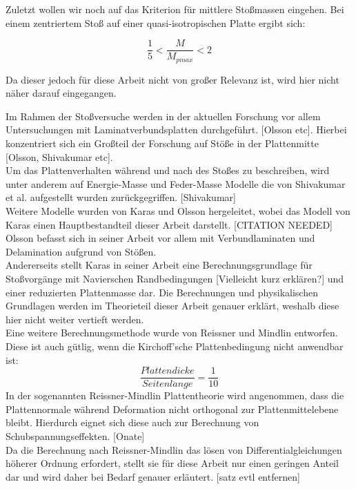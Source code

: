 Zuletzt wollen wir noch auf das Kriterion für mittlere Stoßmassen eingehen. Bei einem zentriertem Stoß auf einer quasi-isotropischen Platte ergibt sich:

\begin{equation}
	\frac{1}{5} < \frac{M}{M_{pmax}} < 2
\end{equation}

Da dieser jedoch für diese Arbeit nicht von großer Relevanz ist, wird hier nicht näher darauf eingegangen.



Im Rahmen der Stoßversuche werden in der aktuellen Forschung vor allem
Untersuchungen mit Laminatverbundsplatten durchgeführt. [Olsson etc]. Hierbei
konzentriert sich ein Großteil der Forschung auf Stöße in der Plattenmitte
[Olsson, Shivakumar etc]. \\
Um das Plattenverhalten während und nach des Stoßes zu beschreiben, wird unter
anderem auf Energie-Masse und Feder-Masse Modelle die von Shivakumar et al.
aufgestellt wurden zurückgegriffen. [Shivakumar] \\
Weitere Modelle wurden von Karas und Olsson hergeleitet, wobei das Modell von
Karas einen Hauptbestandteil dieser Arbeit darstellt. [CITATION NEEDED] Olsson
befasst sich in seiner Arbeit vor allem mit Verbundlaminaten und Delamination
aufgrund von Stößen. \\
Andererseits stellt Karas in seiner Arbeit eine Berechnungsgrundlage für
Stoßvorgänge mit Navierschen Randbedingungen [Vielleicht kurz erklären?] und
einer reduzierten Plattenmasse dar. Die Berechnungen und physikalischen
Grundlagen werden im Theorieteil dieser Arbeit genauer erklärt, weshalb diese
hier nicht weiter vertieft werden.\\
Eine weitere Berechnungsmethode wurde von Reissner und Mindlin entworfen. Diese
ist auch gütlig, wenn die Kirchoff'sche Plattenbedingung nicht anwendbar ist:
\begin{equation}
\frac{Plattendicke}{Seitenl\ddot{a}nge} = \frac{1}{10}
\end{equation}
In der sogenannten Reissner-Mindlin Plattentheorie wird angenommen, dass die
Plattennormale während Deformation nicht orthogonal zur Plattenmittelebene
bleibt. Hierdurch eignet sich diese auch zur Berechnung von
Schubspannungseffekten. [Onate]\\
Da die Berechnung nach Reissner-Mindlin das lösen von Differentialgleichungen
höherer Ordnung erfordert, stellt sie für diese Arbeit nur einen geringen Anteil
dar und wird daher bei Bedarf genauer erläutert. [satz evtl entfernen]\\




